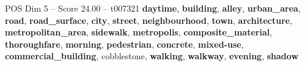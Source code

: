 \begin{textsample}{POS Dim 5 – Score 24.00 – t007321}  \label{ex:f5_pos_006}
\textbf{daytime}, \textbf{building}, \textbf{alley}, \textbf{urban\_area}, \textbf{road}, \textbf{road\_surface}, \textbf{city}, \textbf{street}, \textbf{neighbourhood}, \textbf{town}, \textbf{architecture}, \textbf{metropolitan\_area}, \textbf{sidewalk}, \textbf{metropolis}, \textbf{composite\_material}, \textbf{thoroughfare}, \textbf{morning}, \textbf{pedestrian}, \textbf{concrete}, \textbf{mixed-use}, \textbf{commercial\_building}, cobblestone, \textbf{walking}, \textbf{walkway}, \textbf{evening}, \textbf{shadow}

\end{textsample}
